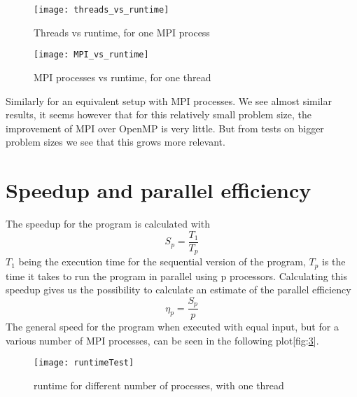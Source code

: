 \begin{figure}[htbp]
	\centering
	\texttt{[image: threads\_vs\_runtime]}
	\caption{Threads vs runtime, for one MPI process}
	\label{fig:threadsnruntime}
\end{figure}
\begin{figure}[htbp]
	\centering
	\texttt{[image: MPI\_vs\_runtime]}
	\caption{MPI processes vs runtime, for one thread}
	\label{fig:MPInruntime}
\end{figure}

Similarly for an equivalent setup with MPI processes. We see almost similar results, it seems however that for this relatively small problem size, the improvement of MPI over OpenMP is very little. But from tests on bigger problem sizes we see that this grows more relevant.


\section{Speedup and parallel efficiency}
The speedup for the program is calculated with
\begin{equation}
S_p = \frac{T_1}{T_p}
\end{equation}
$T_1$ being the execution time for the sequential version of the program, $T_p$ is the time it takes to run the program in parallel using p processors. 
Calculating this speedup gives us the possibility to calculate an estimate of the parallel efficiency 
\begin{equation}
\eta_p = \frac{S_p}{p}
\end{equation}
The general speed for the program when executed with equal input, but for a various number of MPI processes, can be seen in the following plot[fig:\ref{fig:runtime}].
\begin{figure}[htbp]
	\centering
	\texttt{[image: runtimeTest]}
	\caption{runtime for different number of processes, with one thread}
	\label{fig:runtime}
\end{figure}
